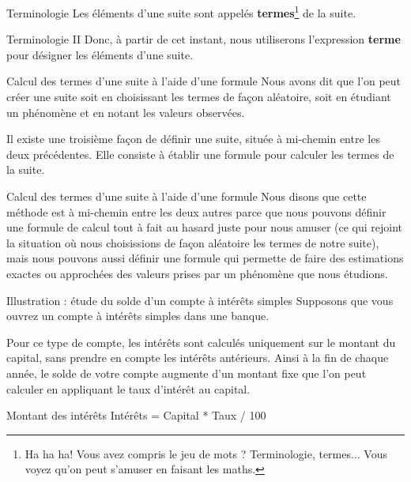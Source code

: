\documentclass{beamer}
\begin{document}
\begin{frame}{Terminologie}
  Les éléments d'une suite sont appelés \textbf{termes}\footnote{Ha ha ha! Vous avez compris le jeu de mots ? Terminologie, termes... Vous voyez qu'on peut s'amuser en faisant les maths.} de la suite.
\end{frame}


\begin{frame}{Terminologie II}
  Donc, à partir de cet instant, nous utiliserons l'expression \textbf{terme} pour désigner les éléments d'une suite.
\end{frame}

\begin{frame}{Calcul des termes d'une suite à l'aide d'une formule}
  Nous avons dit que l'on peut créer une suite soit en choisissant les termes de façon aléatoire, soit en étudiant un phénomène et en notant les valeurs observées.
  
  Il existe une troisième façon de définir une suite, située à mi-chemin entre les deux précédentes. Elle consiste à établir une formule pour calculer les termes de la suite.
\end{frame}

\begin{frame}{Calcul des termes d'une suite à l'aide d'une formule}
  Nous disons que cette méthode est à mi-chemin entre les deux autres parce que nous pouvons définir une formule de calcul tout à fait au hasard juste pour nous amuser (ce qui rejoint la situation où nous choisissions de façon aléatoire les termes de notre suite), mais nous pouvons aussi définir une formule qui permette de faire des estimations exactes ou approchées des valeurs prises par un phénomène que nous étudions.
\end{frame}

\begin{frame}{Illustration : étude du solde d'un compte à intérêts simples}
  Supposons que vous ouvrez un compte à intérêts simples dans une banque.
  
  Pour ce type de compte, les intérêts sont calculés uniquement sur le montant du capital, sans prendre en compte les intérêts antérieurs. Ainsi à la fin de chaque année, le solde de votre compte augmente d'un montant fixe que l'on peut calculer en appliquant le taux d'intérêt au capital.
  
  \vspace{12pt}
  \begin{block}{Montant des intérêts}
    Intérêts = Capital * Taux / 100
  \end{block}
\end{frame}
\end{document}
